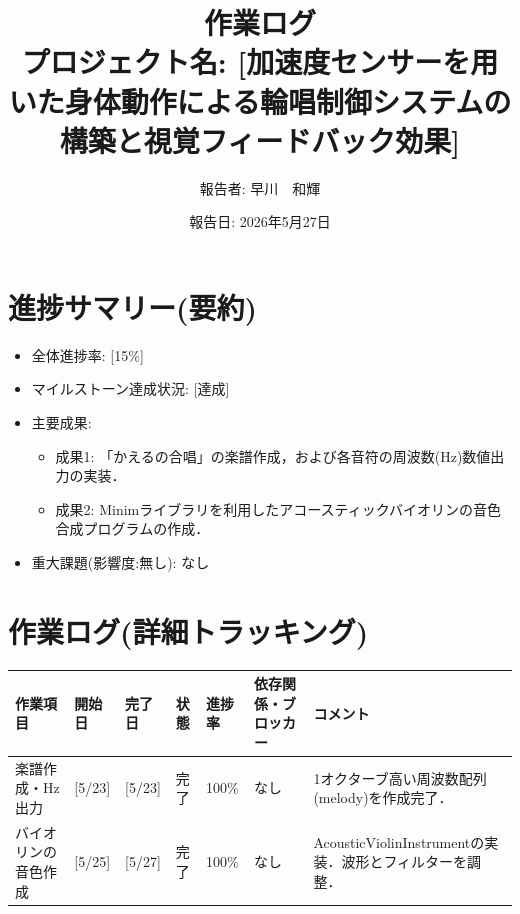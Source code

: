 \documentclass[uplatex,dvipdfmx]{jlreq}
\title{作業ログ\\ \large プロジェクト名: [加速度センサーを用いた身体動作による輪唱制御システムの構築と視覚フィードバック効果]}
\author{報告者: 早川　和輝}
\date{報告日: 2026年5月27日}
\begin{document}
\maketitle

\section{進捗サマリー(要約)}
\begin{itemize}
    \item 全体進捗率: [15\%]
    \item マイルストーン達成状況: [達成]
    \item 主要成果:
    \begin{itemize}
        \item 成果1: 「かえるの合唱」の楽譜作成，および各音符の周波数(Hz)数値出力の実装．
        \item 成果2: Minimライブラリを利用したアコースティックバイオリンの音色合成プログラムの作成．
    \end{itemize}
    \item 重大課題(影響度:無し): なし
\end{itemize}

\section{作業ログ(詳細トラッキング)}
\begin{table}[H]
    \centering
    \small
    \begin{tabular}{lp{1.5cm}p{1.5cm}llp{2.5cm}p{3cm}}
        \toprule
        作業項目 & 開始日 & 完了日 & 状態 & 進捗率 & 依存関係・ブロッカー & コメント \\
        \midrule
        楽譜作成・Hz出力 & [5/23] & [5/23] & 完了 & 100\% & なし & 1オクターブ高い周波数配列(melody)を作成完了． \\
        バイオリンの音色作成 & [5/25] & [5/27] & 完了 & 100\% & なし &  AcousticViolinInstrumentの実装．波形とフィルターを調整． \\
        \bottomrule
    \end{tabular}
\end{table}
\end{document}
